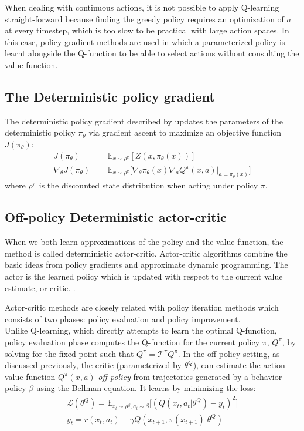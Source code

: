 When dealing with continuous actions, it is not possible to apply Q-learning
straight-forward because finding the greedy policy requires an optimization of $a$ at 
every timestep, which is too slow to be practical with large action spaces.
In this case, policy gradient methods are used in which a parameterized policy is learnt 
alongside the Q-function to be able to select actions without consulting the value function.

\subsection{The Deterministic policy gradient}
The deterministic policy gradient described by \citet{silver2014b} updates the parameters of the
deterministic policy $\pi_\theta$ via gradient ascent to maximize an objective function $J(\pi_\theta)$:
\begin{align}
    J(\pi_\theta) &=  \mathbb E_{x \sim \rho^\pi} [Z(x,\pi_\theta(x))]\\
    \nabla_\theta J(\pi_\theta) &=  \mathbb E_{x \sim \rho^\pi} 
    \big [\nabla_{\theta} \pi_\theta(x) \nabla_a Q^{\pi}(x,a)|_{a=\pi_\theta(x)}  \big]
\end{align} 
where $\rho^\pi$ is the discounted state distribution when acting under policy $\pi$.


\subsection{Off-policy Deterministic actor-critic} \label{subsec:offpolicy_actor_critic}
When we both learn approximations of the policy and the value function, the method is called deterministic actor-critic.
Actor-critic algorithms combine the basic ideas from policy gradients and approximate dynamic programming.
The actor is the learned policy which is updated with respect to the current value estimate, or critic.
\cite{Sutton1998}.

Actor-critic methods are closely related with policy iteration methods \citep{Lagoudakis2004}
which consists of two phases: policy evaluation and policy improvement. \\
Unlike Q-learning, which directly attempts to learn the optimal Q-function, policy evaluation
phase computes the Q-function for the current policy $\pi$, $Q^\pi$, by solving
for the fixed point such that $Q^\pi=\mathcal{T}^\pi Q^\pi$.
In the off-policy setting, as discussed previously, the critic (parameterized by $\theta^Q$), can estimate the 
action-value function $Q^{\pi}(x,a)$ \textit{off-policy}  from
trajectories generated by a behavior policy $\beta$
using the Bellman equation.
It learns by minimizing the loss:
\begin{align}
    \mathcal{L}(\theta^Q) = \mathbb E_{x_t\sim \rho^\beta, a_t\sim \beta} \Big[ (Q(x_t,a_t| \theta^Q)-y_t)^2          \Big] \nonumber\\ 
    y_t = r(x_t,a_t) + \gamma Q(x_{t+1},\pi(x_{t+1})| \theta^Q) \label{eq:bellman_loss}
\end{align}

